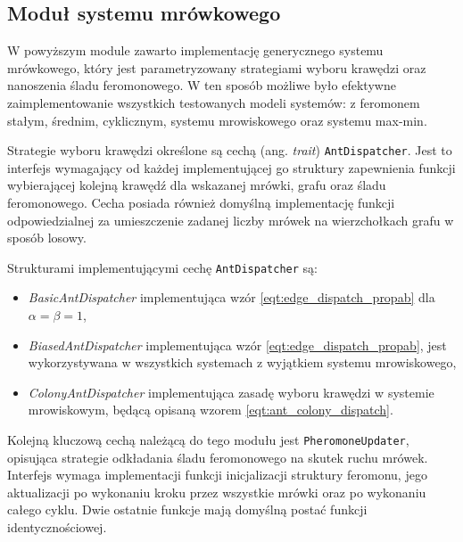 {{        \subsection{Moduł systemu mrówkowego}\label{sec:code_ant_colony}
        {
            W powyższym module zawarto implementację generycznego systemu mrówkowego, który jest parametryzowany
            strategiami wyboru krawędzi oraz nanoszenia śladu feromonowego. W ten sposób możliwe było efektywne
            zaimplementowanie wszystkich testowanych modeli systemów: z feromonem stałym, średnim, cyklicznym, systemu
            mrowiskowego oraz systemu max-min.

            Strategie wyboru krawędzi określone są cechą (ang. \textit{trait}) \texttt{AntDispatcher}. Jest to interfejs
            wymagający od każdej implementującej go struktury zapewnienia funkcji wybierającej kolejną krawędź dla
            wskazanej mrówki, grafu oraz śladu feromonowego. Cecha posiada również domyślną implementację funkcji
            odpowiedzialnej za umieszczenie zadanej liczby mrówek na wierzchołkach grafu w sposób losowy.

            Strukturami implementującymi cechę \texttt{AntDispatcher} są:

            \begin{itemize}
                \item \textit{BasicAntDispatcher} implementująca wzór \ref{eqt:edge_dispatch_propab} dla $\alpha = \beta
                = 1$,
                \item \textit{BiasedAntDispatcher} implementująca wzór \ref{eqt:edge_dispatch_propab}, jest
                wykorzystywana w wszystkich systemach z wyjątkiem systemu mrowiskowego,
                \item \textit{ColonyAntDispatcher} implementująca zasadę wyboru krawędzi w systemie mrowiskowym, będącą opisaną wzorem \ref{eqt:ant_colony_dispatch}.
            \end{itemize}

            Kolejną kluczową cechą należącą do tego modułu jest \texttt{PheromoneUpdater}, opisująca strategie
            odkładania śladu feromonowego na skutek ruchu mrówek. Interfejs wymaga implementacji funkcji inicjalizacji
            struktury feromonu, jego aktualizacji po wykonaniu kroku przez wszystkie mrówki oraz po wykonaniu całego
            cyklu. Dwie ostatnie funkcje mają domyślną postać funkcji identycznościowej.

}}}
